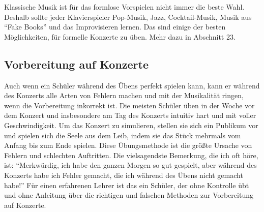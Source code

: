 Klassische Musik ist für das formlose Vorspielen nicht immer die beste Wahl.
Deshalb sollte jeder Klavierspieler Pop-Musik, Jazz, Cocktail-Musik, Musik aus \enquote{Fake Books} und das Improvisieren lernen.
Das sind einige der besten Möglichkeiten, für formelle Konzerte zu üben.
Mehr dazu in Abschnitt 23.


\subsection{Vorbereitung auf Konzerte}
\label{c1iii14f}

Auch wenn ein Schüler während des Übens perfekt spielen kann, kann er während des Konzerts alle Arten von Fehlern machen und mit der Musikalität ringen, wenn die Vorbereitung inkorrekt ist.
Die meisten Schüler üben in der Woche vor dem Konzert und insbesondere am Tag des Konzerts intuitiv hart und mit voller Geschwindigkeit.
Um das Konzert zu simulieren, stellen sie sich ein Publikum vor und spielen sich die Seele aus dem Leib, indem sie das Stück mehrmals vom Anfang bis zum Ende spielen.
Diese Übungsmethode ist die größte Ursache von Fehlern und schlechten Auftritten.
Die vielsagendste Bemerkung, die ich oft höre, ist: \enquote{Merkwürdig, ich habe den ganzen Morgen so gut gespielt, aber während des Konzerts habe ich Fehler gemacht, die ich während des Übens nicht gemacht habe!}
Für einen erfahrenen Lehrer ist das ein Schüler, der ohne Kontrolle übt und ohne Anleitung über die richtigen und falschen Methoden zur Vorbereitung auf Konzerte.

